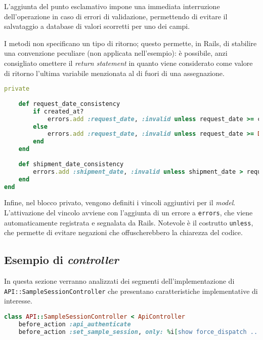 L'aggiunta del punto esclamativo impone una immediata interruzione dell'operazione in caso di errori di validazione, permettendo di evitare il salvataggio a database di valori scorretti per uno dei campi.

I metodi non specificano un tipo di ritorno; questo permette, in Rails, di stabilire una convenzione peculiare (non applicata nell'esempio): è possibile, anzi consigliato omettere il \textit{return statement} in quanto viene considerato come valore di ritorno l'ultima variabile menzionata al di fuori di una assegnazione.
\begin{lstlisting}[caption={\textbf{\texttt{shipment.rb}}},captionpos=b,language=Ruby]
    private
      
    def request_date_consistency
        if created_at?
            errors.add :request_date, :invalid unless request_date >= created_at.to_date
        else
            errors.add :request_date, :invalid unless request_date >= Date.today
        end
    end
      
    def shipment_date_consistency
        errors.add :shipment_date, :invalid unless shipment_date > request_date
    end
end
\end{lstlisting}
Infine, nel blocco privato, vengono definiti i vincoli aggiuntivi per il \textit{model}. L'attivazione del vincolo avviene con l'aggiunta di un errore a \texttt{errors}, che viene automaticamente registrata e segnalata da Rails. Notevole è il costrutto \texttt{unless}, che permette di evitare negazioni che offuscherebbero la chiarezza del codice.

\subsection{Esempio di \textit{controller}}
In questa sezione verranno analizzati dei segmenti dell'implementazione di \texttt{API::SampleSessionController} che presentano caratteristiche implementative di interesse.
\begin{lstlisting}[caption={\textbf{\texttt{sample\_session\_controller.rb}}},captionpos=b,language=Ruby]
class API::SampleSessionController < ApiController
    before_action :api_authenticate
    before_action :set_sample_session, only: %i[show force_dispatch ...]
\end{lstlisting}
 
